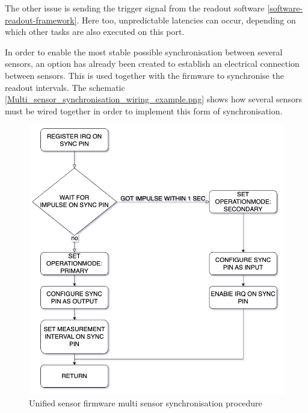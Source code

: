 The other issue is sending the trigger signal from the readout software
\ref{software-readout-framework}. Here too, unpredictable latencies can
occur, depending on which other tasks are also executed on this port.

In order to enable the most stable possible synchronisation between
several sensors, an option has already been created to establish an
electrical connection between sensors. This is used together with the
firmware to synchronise the readout intervals. The schematic
\ref{Multi_sensor_synchronisation_wiring_example.png} shows how several
sensors must be wired together in order to implement this form of
synchronisation.

\begin{figure}
\centering
\includegraphics{./generated_images/border_Unified_sensor_firmware_multi_sensor_synchronisation_procedure.png}
\caption{Unified sensor firmware multi sensor synchronisation procedure
\label{Unified_sensor_firmware_multi_sensor_synchronisation_procedure.png}}
\end{figure}

